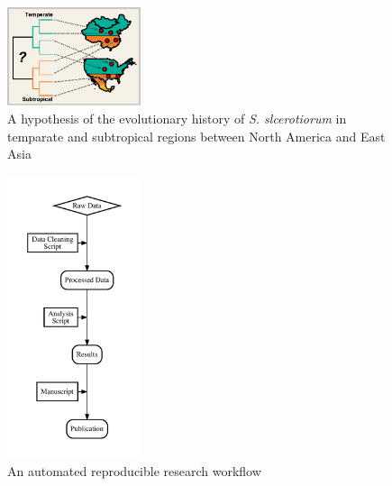 \documentclass[12pt,letterpaper]{article}
\begin{document}
\begin{figure} %
  \includegraphics[width=0.35\textwidth]{figure/us-china.pdf}
  \caption{A hypothesis of the evolutionary history of \textit{S. slcerotiorum} in temparate and subtropical regions between North America and East Asia}
  \label{fig:us-china}
\end{figure}


\begin{figure}  %
  \includegraphics[width=0.35\textwidth]{figure/rr.pdf}
  \caption{An automated reproducible research workflow}
  \label{fig:rr}
\end{figure}
\end{document}
